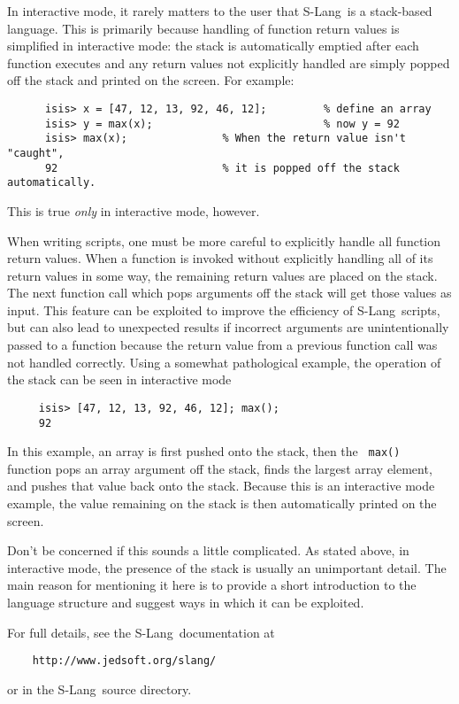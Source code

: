 \documentclass{book}
\newcommand{\slang}{{\sc S-Lang}}
\begin{document}
{In interactive mode, it rarely matters to the user that \slang\ is a stack-based
language.  This is primarily because handling of function return values is
simplified in interactive mode: the stack is automatically emptied after
each function executes and any return values not explicitly handled are
simply popped off the stack and printed on the screen.
For example:
\begin{verbatim}
      isis> x = [47, 12, 13, 92, 46, 12];         % define an array
      isis> y = max(x);                           % now y = 92
      isis> max(x);               % When the return value isn't "caught",
      92                          % it is popped off the stack automatically.
\end{verbatim}
This is true {\it only} in interactive mode, however.

When writing scripts, one must be more careful to explicitly handle all
function return values.  When a function is invoked without explicitly
handling all of its return values in some way, the remaining return values
are placed on the stack.  The next function call which pops arguments off
the stack will get those values as input. This feature can be exploited to
improve the efficiency of \slang{}ripts, but can also lead to unexpected
results if incorrect arguments are unintentionally passed to a function
because the return value from a previous function call was not handled
correctly.  Using a somewhat pathological example, the operation of the
stack can be seen in interactive mode
\begin{verbatim}
     isis> [47, 12, 13, 92, 46, 12]; max();
     92
\end{verbatim}
In this example, an array is first pushed onto the stack, then the {\tt
max() } function pops an array argument off the stack, finds the largest
array element, and pushes that value back onto the stack.  Because this is an
interactive mode example, the value remaining on the stack is then
automatically printed on the screen.

Don't be concerned if this sounds a little complicated. As stated above, in
interactive mode, the presence of the stack is usually an unimportant
detail.  The main reason for mentioning it here is to provide a short
introduction to the language structure and suggest ways in which it can be
exploited.

For full details, see the \slang\ documentation at
\begin{verbatim}
    http://www.jedsoft.org/slang/
\end{verbatim}
or in the \slang\ source directory.

}
\end{document}
